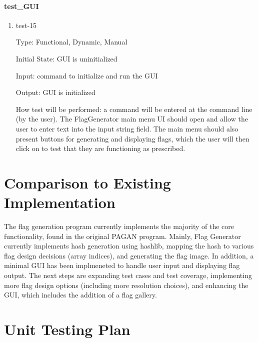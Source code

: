 \documentclass[12pt, titlepage]{article}
\begin{document}
\paragraph{test\_GUI}

\begin{enumerate}

\item{test-15\\}

Type: Functional, Dynamic, Manual

Initial State: GUI is uninitialized

Input: command to initialize and run the GUI

Output: GUI is initialized

How test will be performed: a command will be entered at the command line (by
the user). The FlagGenerator main menu UI should open and allow the user to
enter text into the input string field. The main menu should also present
buttons for generating and displaying flags, which the user will then click on
to test that they are functioning as prescribed.

\end{enumerate}

\section{Comparison to Existing Implementation}	
        The flag generation program currently implements the majority of the core functionality, found in the original PAGAN program. 
        Mainly, Flag Generator currently implements hash generation using hashlib, mapping the hash to various flag design decisions (array indices),
        and generating the flag image. In addition, a minimal GUI has been implmeneted to handle user input and displaying flag output.
        The next steps are  expanding test cases and test coverage, implementing more flag design options (including more resolution choices), and enhancing the GUI, which includes the addition of a flag gallery.
\section{Unit Testing Plan}
		
\end{document}
